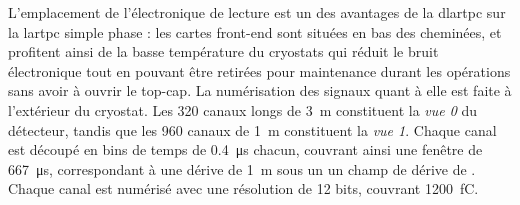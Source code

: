       L'emplacement de l'électronique de lecture est un des avantages de la \gls{dlartpc} sur la \gls{lartpc} simple phase : les cartes front-end sont situées en bas des cheminées, et profitent ainsi de la basse température du cryostats qui réduit le bruit électronique tout en pouvant être retirées pour maintenance durant les opérations sans avoir à ouvrir le top-cap. La numérisation des signaux quant à elle est faite à l'extérieur du cryostat. Les 320 canaux longs de \SI{3}{\meter} constituent la \textit{vue 0} du détecteur, tandis que les 960 canaux de \SI{1}{\meter} constituent la \textit{vue 1}. Chaque canal est découpé en  bins de temps de \SI{0.4}{\micro\second} chacun, couvrant ainsi une fenêtre de \SI{667}{\micro\second}, correspondant à une dérive de \SI{1}{\meter} sous un un champ de dérive de \driftfield{}. Chaque canal est numérisé avec une résolution de 12 bits, couvrant \SI{1200}{\femto\coulomb}. 
        

